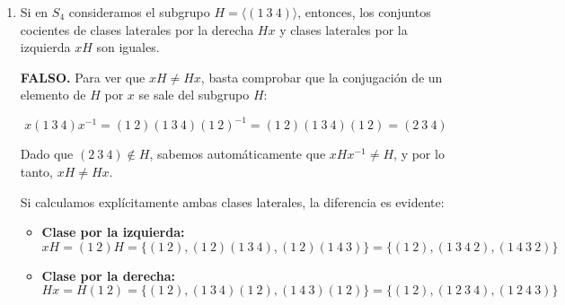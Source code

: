 \documentclass[12pt]{article}
\begin{document}
\begin{ejercicio}[1 punto]
\begin{enumerate}
            \textbf{FALSO.} Consideremos el grupo cíclico $C_4$ y el grupo de Klein $V_4$. Ambos son grupos de orden 4 no isomorfos entre sí ($C_4 \not\cong V_4$). Sin embargo, ambos poseen subgrupos propios de orden 2 que son isomorfos a $C_2$.
            \item Si en $S_4$ consideramos el subgrupo $H = \langle (1\ 3\ 4) \rangle$, entonces, los conjuntos cocientes de clases laterales por la derecha $Hx$ y clases laterales por la izquierda $xH$ son iguales.
            
            \textbf{FALSO.} Para ver que $xH \neq Hx$, basta comprobar que la conjugación de un elemento de $H$ por $x$ se sale del subgrupo $H$:

            $$x (1\ 3\ 4) x^{-1} = (1\ 2)(1\ 3\ 4)(1\ 2)^{-1} = (1\ 2)(1\ 3\ 4)(1\ 2) = (2\ 3\ 4)$$

            Dado que $(2\ 3\ 4) \notin H$, sabemos automáticamente que $xHx^{-1} \neq H$, y por lo tanto, $xH \neq Hx$. 

            Si calculamos explícitamente ambas clases laterales, la diferencia es evidente:
            \begin{itemize}
                \item \textbf{Clase por la izquierda:} $$xH = (1\ 2)H = \{(1\ 2), (1\ 2)(1\ 3\ 4), (1\ 2)(1\ 4\ 3)\} = \{(1\ 2), (1\ 3\ 4\ 2), (1\ 4\ 3\ 2)\}$$
                \item \textbf{Clase por la derecha:} $$Hx = H(1\ 2) = \{(1\ 2), (1\ 3\ 4)(1\ 2), (1\ 4\ 3)(1\ 2)\} = \{(1\ 2), (1\ 2\ 3\ 4), (1\ 2\ 4\ 3)\}$$
            \end{itemize}
        \end{enumerate}
    \end{ejercicio}
\end{document}
